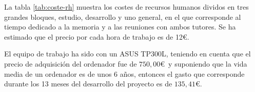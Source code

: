 \vspace{0.6cm}
La tabla \ref{tab:coste-rh} muestra los costes de recursos humanos dividos en tres grandes bloques, estudio, desarrollo y uno general, en el que corresponde al tiempo dedicado a la memoria y a las reuniones con ambos tutores. Se ha estimado que el precio por cada hora de trabajo es de 12\euro.\\

\begin{table}[h]
	\begin{center}
	\centering
	\end{center}
	\caption{Desglose de los costes en recursos humanos}
	\label{tab:coste-rh}
\end{table}
\vspace{0.6cm}

El equipo de trabajo ha sido con un ASUS TP$300$L, teniendo en cuenta que el precio de adquisición del ordenador fue de $750,00$\euro\ y suponiendo que la vida media de un ordenador es de unos 6 años, entonces el gasto que corresponde durante los 13 meses del desarrollo del proyecto es de  $135,41$\euro.\\



